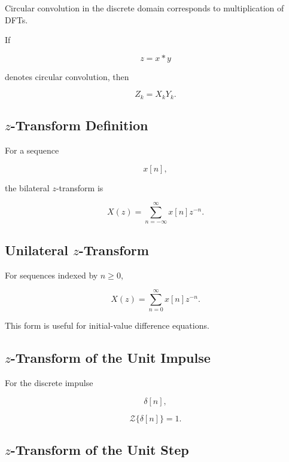 Circular convolution in the discrete domain corresponds to multiplication of
DFTs.

If

\[
z=x*y
\]

denotes circular convolution, then

\[
\boxed{
Z_k
=
X_kY_k.
}
\]

\subsection{\(z\)-Transform Definition}
\label{subsec:z-transform-definition-reference}

For a sequence

\[
x[n],
\]

the bilateral \(z\)-transform is

\[
\boxed{
X(z)
=
\sum_{n=-\infty}^{\infty}
x[n]z^{-n}.
}
\]

\subsection{Unilateral \(z\)-Transform}
\label{subsec:unilateral-z-transform}

For sequences indexed by \(n\geq0\),

\[
\boxed{
X(z)
=
\sum_{n=0}^{\infty}
x[n]z^{-n}.
}
\]

This form is useful for initial-value difference equations.

\subsection{\(z\)-Transform of the Unit Impulse}
\label{subsec:z-transform-unit-impulse}

For the discrete impulse

\[
\delta[n],
\]

\[
\boxed{
\mathcal{Z}\{\delta[n]\}
=
1.
}
\]

\subsection{\(z\)-Transform of the Unit Step}
\label{subsec:z-transform-unit-step}

